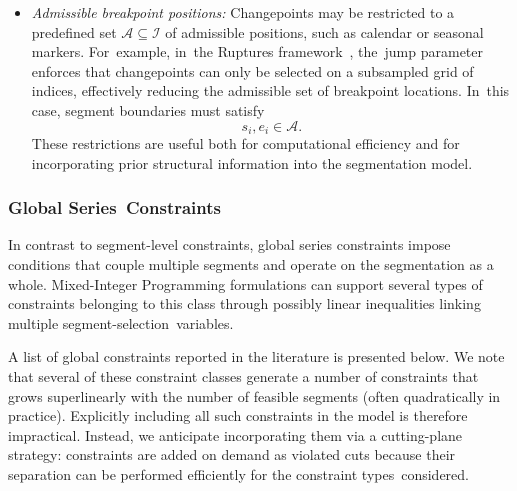 \documentclass[mathematics,article,accept,pdftex,moreauthors]{Definitions/mdpi}
\begin{document}
\begin{itemize}
	\item {\it Admissible breakpoint positions:}
	Changepoints may be restricted to a predefined set $\mathcal{A} \subseteq \mathcal{I}$ of admissible positions, such as calendar or seasonal markers. For~example, in~the Ruptures framework~\cite{TOV20}, the~jump parameter enforces that changepoints can only be selected on a subsampled grid of indices, effectively reducing the admissible set of breakpoint locations. In~this case, segment boundaries must satisfy
\begin{equation}
		s_i,e_i \in \mathcal{A}.
	\end{equation}
	These restrictions are useful both for computational efficiency and for incorporating prior structural information into the segmentation model. 	
\end{itemize}

\subsubsection{Global Series~Constraints} \label{subsubsec:global_series_constraints}

In contrast to segment-level constraints, global series constraints impose conditions that couple multiple segments and operate on the segmentation as a whole. 
Mixed-Integer Programming formulations can support several types of constraints belonging to this class through possibly linear inequalities linking multiple segment-selection~variables.

A list of global constraints reported in the literature is presented below. We note that several of these constraint classes generate a number of constraints that grows superlinearly with the number of feasible segments (often quadratically in practice). Explicitly including all such constraints in the model is therefore impractical. Instead, we anticipate incorporating them via a cutting-plane strategy: constraints are added on demand as violated cuts because their separation can be performed efficiently for the constraint types~considered.
\end{document}
